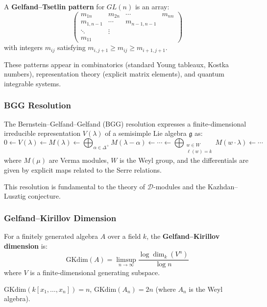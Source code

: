 \begin{definition}
A \textbf{Gelfand--Tsetlin pattern} for $GL(n)$ is an array:
\[
\begin{pmatrix}
m_{1n} & m_{2n} & \cdots & m_{nn} \\
m_{1,n-1} & \cdots & m_{n-1,n-1} \\
\ddots & \vdots \\
m_{11}
\end{pmatrix}
\]
with integers $m_{ij}$ satisfying $m_{i,j+1} \geq m_{ij} \geq m_{i+1,j+1}$.
\end{definition}

These patterns appear in combinatorics (standard Young tableaux, Kostka numbers), representation theory (explicit matrix elements), and quantum integrable systems.

\subsubsection{BGG Resolution}

The Bernstein--Gelfand--Gelfand (BGG) resolution expresses a finite-dimensional irreducible representation $V(\lambda)$ of a semisimple Lie algebra $\mathfrak{g}$ as:
\[
0 \leftarrow V(\lambda) \leftarrow M(\lambda) \leftarrow \bigoplus_{\alpha \in \Delta^+} M(\lambda - \alpha) \leftarrow \cdots \leftarrow \bigoplus_{\substack{w \in W \\ \ell(w) = k}} M(w\cdot\lambda) \leftarrow \cdots
\]
where $M(\mu)$ are Verma modules, $W$ is the Weyl group, and the differentials are given by explicit maps related to the Serre relations.

This resolution is fundamental to the theory of $\mathcal{D}$-modules and the Kazhdan--Lusztig conjecture.

\subsubsection{Gelfand--Kirillov Dimension}

For a finitely generated algebra $A$ over a field $k$, the \textbf{Gelfand--Kirillov dimension} is:
\[
\mathrm{GKdim}(A) = \limsup_{n \to \infty} \frac{\log \dim_k(V^n)}{\log n}
\]
where $V$ is a finite-dimensional generating subspace.

\begin{example}
$\mathrm{GKdim}(k[x_1,\dots,x_n]) = n$, $\mathrm{GKdim}(A_n) = 2n$ (where $A_n$ is the Weyl algebra).
\end{example}

